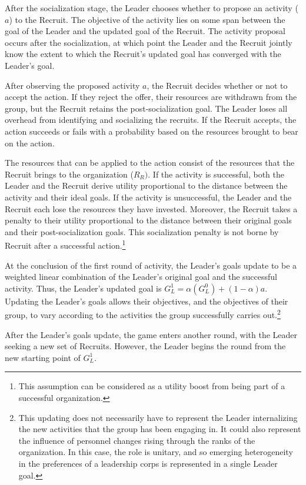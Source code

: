After the socialization stage, the Leader chooses whether to propose an activity ($a$) to the Recruit. The objective of the activity lies on some span between the goal of the Leader and the updated goal of the Recruit. The activity proposal occurs after the socialization, at which point the Leader and the Recruit jointly know the extent to which the Recruit's updated goal has converged with the Leader's goal. 

After observing the proposed activity $a$, the Recruit decides whether or not to accept the action. If they reject the offer, their resources are withdrawn from the group, but the Recruit retains the post-socialization goal. The Leader loses all overhead from identifying and socializing the recruits.  If the Recruit accepts, the action succeeds or fails with a probability based on the resources brought to bear on the action. 

The resources that can be applied to the action consist of the resources that the Recruit brings to the organization ($R_{R})$.  If the activity is successful, both the Leader and the Recruit derive utility proportional to the distance between the activity and their ideal goals. If the activity is unsuccessful, the Leader and the Recruit each lose the resources they have invested. Moreover, the Recruit takes a penalty to their utility proportional to the distance between their original goals and their post-socialization goals.  This socialization penalty is not borne by Recruit after a successful action.\footnote{This assumption can be considered as a utility boost from being part of a successful organization.}

At the conclusion of the first round of activity, the Leader's goals update to be a weighted linear combination of the Leader's original goal and the successful activity. Thus, the Leader's updated goal is $G^{1}_{L}= \alpha(G^{0}_{L}) +(1-\alpha)a$. Updating the Leader's goals allows their objectives, and the objectives of their group, to vary according to the activities the group successfully carries out.\footnote{This updating does not necessarily have to represent the Leader internalizing the new activities that the group has been engaging in. It could also represent the influence of personnel changes rising through the ranks of the organization. In this case, the  role is unitary, and so emerging heterogeneity in the preferences of a leadership corps is represented in a single Leader goal.} 

After the Leader's goals update, the game enters another round, with the Leader seeking a new set of Recruits.  However, the Leader begins the round from the new starting point of $G^{1}_{L}$.  

